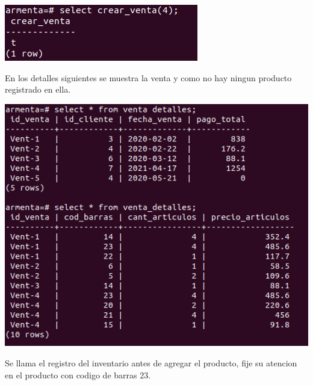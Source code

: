 \documentclass[12pt, letterpaper]{article}     %
\begin{document}
		\begin{center}
 	  	\includegraphics[scale=0.5]{crear_venta}
		\end{center}
		
		En los detalles siguientes se muestra la venta y como no hay ningun producto registrado en ella.		
		
		\begin{center}
 	  	\includegraphics[scale=0.5]{venta_after}
		\end{center}
		
		Se llama el registro del inventario antes de agregar el producto, fije su atencion en el producto con codigo de barras 23.	
		
\end{document}
